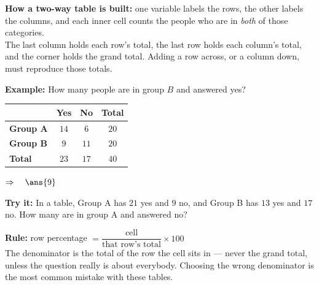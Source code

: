 \documentclass[12pt]{article}
\begin{document}


\begin{formulabox}
\textbf{How a two-way table is built:} one variable labels the rows, the other labels the columns,
and each inner cell counts the people who are in \textit{both} of those categories.\\[3pt]
The last column holds each row's total, the last row holds each column's total, and the corner
holds the grand total. Adding a row across, or a column down, must reproduce those totals.
\end{formulabox}

\begin{examplebox}
\textbf{Example:} \quad How many people are in group $B$ and answered yes?
\par\vspace{0.05cm}
\begin{center}\small
\begin{tabular}{|l|c|c|c|}
\hline
 & \textbf{Yes} & \textbf{No} & \textbf{Total} \\ \hline
\textbf{Group A} & $14$ & $6$ & $20$ \\ \hline
\textbf{Group B} & $9$ & $11$ & $20$ \\ \hline
\textbf{Total} & $23$ & $17$ & $40$ \\ \hline
\end{tabular}
\end{center}
$\Rightarrow\quad \ans{9}$
\end{examplebox}

\begin{tryitbox}
\textbf{Try it:} \quad In a table, Group A has $21$ yes and $9$ no, and Group B has $13$ yes and
$17$ no. How many are in group A and answered no?\\[2pt]
\end{tryitbox}


\begin{formulabox}
\textbf{Rule:} \quad row percentage $= \dfrac{\text{cell}}{\text{that row's total}} \times 100$\\[3pt]
The denominator is the total of the row the cell sits in --- never the grand total, unless the
question really is about everybody. Choosing the wrong denominator is the most common mistake
with these tables.
\end{formulabox}
\end{document}
